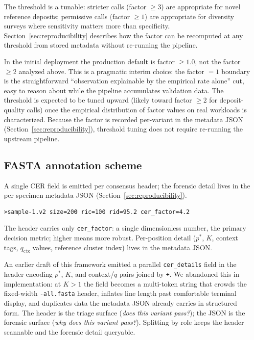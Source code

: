 \documentclass[11pt]{article}
\begin{document}
The threshold is a tunable: stricter calls (factor $\geq 3$) are appropriate
for novel reference deposits; permissive calls (factor $\geq 1$) are
appropriate for diversity surveys where sensitivity matters more than
specificity. Section~\ref{sec:reproducibility} describes how the factor can be
recomputed at any threshold from stored metadata without re-running the
pipeline.

In the initial deployment the production default is factor $\geq 1.0$, not
the factor $\geq 2$ analyzed above. This is a pragmatic interim choice: the
factor $= 1$ boundary is the straightforward ``observation explainable by the
empirical rate alone'' cut, easy to reason about while the pipeline accumulates
validation data. The threshold is expected to be tuned upward (likely toward
factor $\geq 2$ for deposit-quality calls) once the empirical distribution of
factor values on real workloads is characterized. Because the factor is recorded
per-variant in the metadata JSON (Section~\ref{sec:reproducibility}), threshold
tuning does not require re-running the upstream pipeline.

\subsection{FASTA annotation scheme}
\label{sec:fasta_annotation}

A single CER field is emitted per consensus header; the forensic detail lives
in the per-specimen metadata JSON (Section~\ref{sec:reproducibility}).

\begin{lstlisting}
>sample-1.v2 size=200 ric=100 rid=95.2 cer_factor=4.2
\end{lstlisting}

The header carries only \texttt{cer\_factor}: a single dimensionless number,
the primary decision metric; higher means more robust. Per-position detail
($p^*$, $K$, context tags, $q_\text{ctx}$ values, reference cluster index)
lives in the metadata JSON.

An earlier draft of this framework emitted a parallel \texttt{cer\_details}
field in the header encoding $p^*$, $K$, and context/$q$ pairs joined by
\texttt{+}. We abandoned this in implementation: at $K > 1$ the field becomes
a multi-token string that crowds the fixed-width \texttt{-all.fasta} header,
inflates line length past comfortable terminal display, and duplicates data
the metadata JSON already carries in structured form. The header is the
triage surface (\emph{does this variant pass?}); the JSON is the forensic
surface (\emph{why does this variant pass?}). Splitting by role keeps the
header scannable and the forensic detail queryable.
\end{document}

